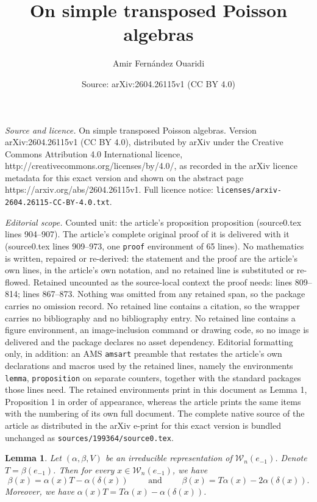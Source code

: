 \documentclass[10pt,a4paper]{amsart}
\title{On simple transposed Poisson algebras}
\author{Amir Fern\'andez Ouaridi}
\date{Source: arXiv:2604.26115v1 (CC BY 4.0)}
\newtheorem{lemma}{Lemma}
\begin{document}
\maketitle

\noindent\emph{Source and licence.} On simple transposed Poisson algebras. Version arXiv:2604.26115v1 (CC BY 4.0), distributed by arXiv under the Creative Commons Attribution 4.0 International licence, http://creativecommons.org/licenses/by/4.0/, as recorded in the arXiv licence metadata for this exact version and shown on the abstract page https://arxiv.org/abs/2604.26115v1. Full licence notice: \texttt{licenses/arxiv-2604.26115-CC-BY-4.0.txt}.\par\smallskip

\noindent\textit{Editorial scope.} Counted unit: the article's proposition proposition (source0.tex lines 904--907). The article's complete original proof of it is delivered with it (source0.tex lines 909--973, one \texttt{proof} environment of 65 lines). No mathematics is written, repaired or re-derived: the statement and the proof are the article's own lines, in the article's own notation, and no retained line is substituted or re-flowed.  Retained uncounted as the source-local context the proof needs: lines 809--814; lines 867--873.  Nothing was omitted from any retained span, so the package carries no omission record.  No retained line contains a citation, so the wrapper carries no bibliography and no bibliography entry.  No retained line contains a figure environment, an image-inclusion command or drawing code, so no image is delivered and the package declares no asset dependency.  Editorial formatting only, in addition: an AMS \texttt{amsart} preamble that restates the article's own declarations and macros used by the retained lines, namely the environments \texttt{lemma}, \texttt{proposition} on separate counters, together with the standard packages those lines need.  The retained environments print in this document as Lemma 1, Proposition 1 in order of appearance, whereas the article prints the same items with the numbering of its own full document.  The complete native source of the article as distributed in the arXiv e-print for this exact version is bundled unchanged as \texttt{sources/199364/source0.tex}.
\begin{lemma}\label{relsbeta1}
    Let $(\alpha,\beta,V)$ be an irreducible representation of
$\mathcal{W}_n(e_{-1})$. Denote $T=\beta(e_{-1})$. Then for every $x\in \mathcal{W}_n(e_{-1})$, we have
$$\beta(x) = \alpha(x)T - \alpha(\delta(x)) \qquad \textrm{ and } \qquad \beta(x) = T \alpha(x) - 2 \alpha(\delta(x)).$$
Moreover, we have  $\alpha(x)T=T\alpha(x)-\alpha(\delta(x))$. 
\end{lemma}
\end{document}
